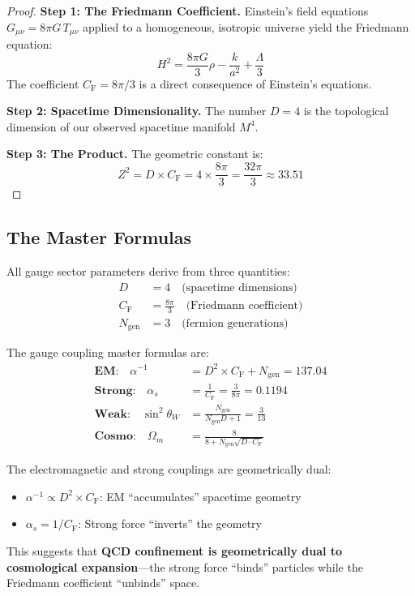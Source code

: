 \documentclass[aps,prd,twocolumn,superscriptaddress,nofootinbib]{revtex4-2}
\newcommand{\Zs}{Z^2}
\newcommand{\CF}{C_{\mathrm{F}}}
\newcommand{\Ngen}{N_{\mathrm{gen}}}
\newcommand{\sinW}{\sin^2\theta_W}
\newcommand{\alphas}{\alpha_s}
\newcommand{\alphainv}{\alpha^{-1}}
\newcommand{\Omegam}{\Omega_m}
\begin{document}
\begin{proof}
\textbf{Step 1: The Friedmann Coefficient.} Einstein's field equations $G_{\mu\nu} = 8\pi G \, T_{\mu\nu}$ applied to a homogeneous, isotropic universe yield the Friedmann equation:
\begin{equation}
H^2 = \frac{8\pi G}{3}\rho - \frac{k}{a^2} + \frac{\Lambda}{3}
\end{equation}
The coefficient $\CF = 8\pi/3$ is a direct consequence of Einstein's equations.

\textbf{Step 2: Spacetime Dimensionality.} The number $D = 4$ is the topological dimension of our observed spacetime manifold $M^4$.

\textbf{Step 3: The Product.} The geometric constant is:
\begin{equation}
\Zs = D \times \CF = 4 \times \frac{8\pi}{3} = \frac{32\pi}{3} \approx 33.51
\end{equation}
\end{proof}

\subsection{The Master Formulas}

All gauge sector parameters derive from three quantities:
\begin{align}
D &= 4 \quad \text{(spacetime dimensions)} \\
\CF &= \frac{8\pi}{3} \quad \text{(Friedmann coefficient)} \\
\Ngen &= 3 \quad \text{(fermion generations)}
\end{align}

The gauge coupling master formulas are:
\begin{align}
\textbf{EM:} \quad \alphainv &= D^2 \times \CF + \Ngen = 137.04 \label{eq:alpha} \\
\textbf{Strong:} \quad \alphas &= \frac{1}{\CF} = \frac{3}{8\pi} = 0.1194 \label{eq:alphas} \\
\textbf{Weak:} \quad \sinW &= \frac{\Ngen}{\Ngen D + 1} = \frac{3}{13} \label{eq:weinberg} \\
\textbf{Cosmo:} \quad \Omegam &= \frac{8}{8 + \Ngen\sqrt{D \cdot \CF}} \label{eq:omega}
\end{align}

\begin{remark}
The electromagnetic and strong couplings are geometrically dual:
\begin{itemize}
\item $\alphainv \propto D^2 \times \CF$: EM ``accumulates'' spacetime geometry
\item $\alphas = 1/\CF$: Strong force ``inverts'' the geometry
\end{itemize}
This suggests that \textbf{QCD confinement is geometrically dual to cosmological expansion}---the strong force ``binds'' particles while the Friedmann coefficient ``unbinds'' space.
\end{remark}
\end{document}
